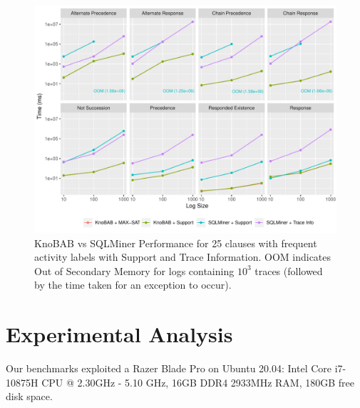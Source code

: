 \begin{figure}[!t]
	\hspace*{-3mm}
	\includegraphics[width=1.05\linewidth]{images/sqlminer_benchmark.pdf}
	\caption{KnoBAB vs SQLMiner Performance for 25 clauses with frequent activity labels with Support and Trace Information. OOM indicates Out of Secondary Memory for logs containing $10^3$ traces (followed by the time taken for an exception to occur).}\label{fig:vsSQL}
\end{figure}
\section{Experimental Analysis}\label{sec:exp}
Our benchmarks exploited a Razer Blade Pro on Ubuntu 20.04: Intel Core i7-10875H CPU @ 2.30GHz - 5.10 GHz, 16GB DDR4 2933MHz RAM, 180GB free disk space.


